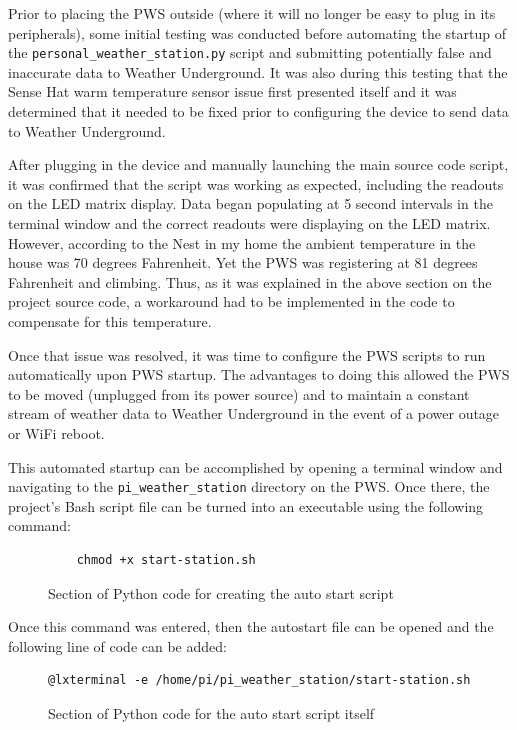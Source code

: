\documentclass[sigconf]{acmart}
\begin{document}
Prior to placing the PWS outside (where it will no longer be easy to plug in its peripherals), some initial testing was conducted before automating the startup of the \verb|personal_weather_station.py| script and submitting potentially false and inaccurate data to Weather Underground. It was also during this testing that the Sense Hat warm temperature sensor issue first presented itself and it was determined that it needed to be fixed prior to configuring the device to send data to Weather Underground. 

After plugging in the device and manually launching the main source code script, it was confirmed that the script was working as expected, including the readouts on the LED matrix display. Data began populating at 5 second intervals in the terminal window and the correct readouts were displaying on the LED matrix. However, according to the Nest in my home the ambient temperature in the house was 70 degrees Fahrenheit. Yet the PWS was registering at 81 degrees Fahrenheit and climbing. Thus, as it was explained in the above section on the project source code, a workaround had to be implemented in the code to compensate for this temperature. 

Once that issue was resolved, it was time to configure the PWS scripts to run automatically upon PWS startup. The advantages to doing this allowed the PWS to be moved (unplugged from its power source) and to maintain a constant stream of weather data to Weather Underground in the event of a power outage or WiFi reboot. 

This automated startup can be accomplished by opening a terminal window and navigating to the \verb|pi_weather_station| directory on the PWS. Once there, the project's Bash script file can be turned into an executable using the following command:

\begin{figure}[htb]
\begin{verbatim}
    chmod +x start-station.sh
\end{verbatim}
\caption{Section of Python code for creating the auto start script}\label{F:upload}
\end{figure}

Once this command was entered, then the autostart file can be opened and the following line of code can be added:

\begin{figure}[htb]
\begin{verbatim}
@lxterminal -e /home/pi/pi_weather_station/start-station.sh
\end{verbatim}
\caption{Section of Python code for the auto start script itself}\label{F:upload}
\end{figure}
\end{document}
